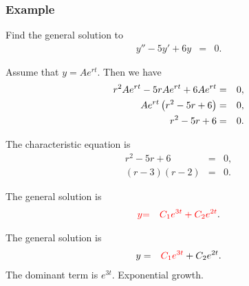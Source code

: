 \begin{frame}
  \frametitle{Example}

  Find the general solution to
  \begin{eqnarray*}
    y'' - 5y' + 6y & = & 0.
  \end{eqnarray*}


  {
    Assume that $y=Ae^{rt}$. Then we have
    \begin{eqnarray*}
      r^2Ae^{rt} - 5r Ae^{rt} + 6 Ae^{rt} & = & 0, \\
      Ae^{rt} \left( r^2 - 5r + 6 \right) & = & 0, \\
      r^2 - 5r + 6 & = & 0.
    \end{eqnarray*}
  }

  {
    The characteristic equation is
    \begin{eqnarray*}
      r^2 - 5r + 6 & = & 0, \\
      (r-3)(r-2) & = & 0.
    \end{eqnarray*}

    The general solution is
    \begin{eqnarray*}
      {\color{red}y} & {\color{red}=} & {\color{red}C_1 e^{3t} + C_2 e^{2t}}.
    \end{eqnarray*}

  }


  {
    The general solution is
    \begin{eqnarray*}
      y & = & {\color{red}C_1 e^{3t}} + C_2 e^{2t}.
    \end{eqnarray*}
    The dominant term is $e^{3t}$. Exponential growth.
  }



\end{frame}


